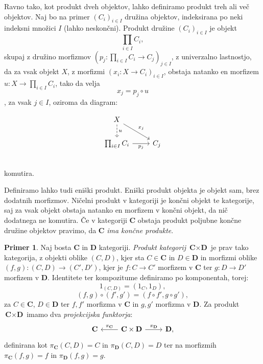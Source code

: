 \documentclass[12pt,a4paper]{book}
\theoremstyle{definition}
\theoremstyle{plain}
\theoremstyle{definition}
\newtheorem{primer}{Primer}[section]
\theoremstyle{remark}
\newcommand{\cat}[1]{\textbf{#1}}
\begin{document}
Ravno tako, kot produkt dveh objektov, lahko definiramo produkt treh ali več objektov. Naj bo na primer $(C_i)_{i \in I}$ družina objektov, indeksirana po neki indeksni množici $I$ (lahko neskončni). Produkt družine $(C_i)_{i \in I}$ je objekt
$$\prod_{i \in I}C_i,$$
skupaj z družino morfizmov $(p_j : \prod_{i \in I}C_i \to C_j)_{j \in I}$, z univerzalno lastnostjo, da za vsak objekt $X$, z morfizmi $(x_i : X \to C_i)_{i \in I}$, obstaja natanko en morfizem $u : X \to \prod_{i \in I}C_i$, tako da velja $$x_j = p_j \circ u$$, za vsak $j \in I$, oziroma da diagram:

$$\begin{tikzcd}
X \ar[d, dashed, "u"] \ar[dr, "x_j"] & \\
\prod_{i \in I}C_i \ar[r, "p_j"'] & C_j \\
\end{tikzcd}$$
komutira.

Definiramo lahko tudi eniški produkt. Eniški produkt objekta je objekt sam, brez dodatnih morfizmov. Ničelni produkt v kategoriji je končni objekt te kategorije, saj za vsak objekt obstaja natanko en morfizem v končni objekt, da nič dodatnega ne komutira. Če v kategoriji $\cat{C}$ obstaja produkt poljubne končne družine objektov pravimo, da $\cat{C}$ \emph{ima končne produkte}.

\begin{primer}
Naj bosta $\cat{C}$ in $\cat{D}$ kategoriji. \emph{Produkt kategorij} $\cat{C} \times \cat{D}$ je prav tako kategorija, z objekti oblike $(C,D)$, kjer sta $C \in \cat{C}$ in $D \in \cat{D}$ in morfizmi oblike $(f,g) : (C,D) \to (C',D')$, kjer je $f : C \to C'$ morfizem v $\cat{C}$ ter $g : D \to D'$ morfizem v $\cat{D}$. Identitete ter kompozitume definiramo po komponentah, torej:
\begin{equation*}
1_{(C,D)} = (1_C,1_D),
\end{equation*}
\begin{equation*}
(f,g) \circ (f',g') = (f \circ f', g \circ g'),
\end{equation*}
za $C \in \cat{C}$, $D \in \cat{D}$ ter $f,f'$ morfizma v $\cat{C}$ in $g,g'$ morfizma v $\cat{D}$.
Za produkt $\cat{C} \times \cat{D}$ imamo dva \textit{projekcijska funktorja}:
\[
\begin{tikzcd}
\cat{C} & \arrow[l, "\pi_{\cat{C}}"'] \cat{C} \times \cat{D} \arrow[r, "\pi_{\cat{D}}"] & \cat{D},
\end{tikzcd}
\]
definirana kot $\pi_{\cat{C}}(C,D) = C$ in $\pi_{\cat{D}}(C,D) = D$ ter na morfizmih $\pi_{\cat{C}}(f,g) = f$ in $\pi_{\cat{D}}(f,g) = g$.
\end{primer}
\end{document}
